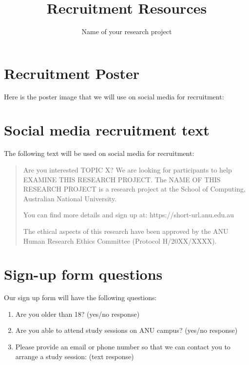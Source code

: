 \documentclass[11pt, a4paper, oneside]{article}
\title{Recruitment Resources}
\subtitle{Name of your research project}
\begin{document}
\section{Recruitment Poster}

Here is the poster image that we will use on social media for recruitment:


\section{Social media recruitment text}

The following text will be used on social media for recruitment:

\begin{quote}
  Are you interested TOPIC X? We are looking for participants to help EXAMINE THIS RESEARCH PROJECT. The NAME OF THIS RESEARCH PROJECT is a research project at the School of Computing, Australian National University.

    You can find more details and sign up at: https://short-url.anu.edu.au

    The ethical aspects of this research have been approved by the ANU Human Research Ethics Committee (Protocol H/20XX/XXXX).  
\end{quote}

\section{Sign-up form questions}

Our sign up form will have the following questions:

\begin{enumerate}
    \item Are you older than 18? (yes/no response)
    \item Are you able to attend study sessions on ANU campus? (yes/no response)
    \item Please provide an email or phone number so that we can contact you to arrange a study session: (text response)
\end{enumerate}
\end{document}
